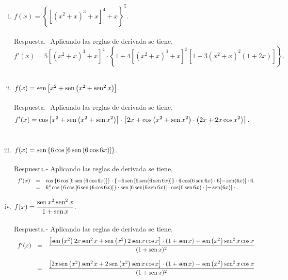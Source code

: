 \begin{enumerate}[\bfseries 1.]
\begin{enumerate}[(i)]
	    \item $f(x)=\left\{\left[\left(x^2+x\right)^3+x\right]^4+x\right\}^5$.\\\\
		Respuesta.-\; Aplicando las reglas de derivada se tiene,
		$$f'(x)=5\left[\left(x^2+x\right)^3+x\right]^4\cdot \left\{1+4\left[\left(x^2+x\right)^3+x\right]^3\left[1+3\left(x^2+x\right)^2\left(1+2x\right)\right]\right\}.$$\\

	    \item $f(x)=\sen\left[x^2+\sen\left(x^2+\sen^2 x\right)\right]$.\\\\
		Respuesta.-\; Aplicando las reglas de derivada se tiene,
		$$f'(x)=\cos\left[x^2+\sen\left(x^2+\sen x^2\right)\right]\cdot\left[2x+\cos\left(x^2+\sen x^2\right)\cdot \left(2x+2x\cos x^2\right)\right].$$\\

	    \item $f(x)=\sen\left\{6\cos\left[6\sen\left(6\cos 6x\right)\right]\right\}$.\\\\
		Respuesta.-\; Aplicando las reglas de derivada se tiene,
		$$\begin{array}{rcl}
		    f'(x)&=&\cos\left\{6\cos\left[6\sen\left(6\cos 6x\right)\right]\right\}\cdot\left\{ -6\sen\left[6\sen(6\sen 6x)\right]\right\}\cdot6\cos(6\sen 6x)\cdot 6[-\sen(6x)]\cdot 6.\\
		    &=&6^4\cos\left\{6\cos\left[6\sen\left(6\cos 6x\right)\right]\right\}\cdot\sen\left[6\sen(6\sen 6x)\right]\cdot\cos(6\sen 6x)\cdot [-\sen(6x)]\cdot.\\
		\end{array}$$
		\vspace{.7cm}

	    \item $f(x)=\dfrac{\sen x^2 \sen^2 x}{1+\sen x}$.\\\\
		Respuesta.-\; Aplicando las reglas de derivada se tiene,
		$$\begin{array}{rcl}
		    f'(x)&=&\dfrac{\left[\sen\left(x^2\right)2x\sen^2 x +\sen \left(x^2\right)2\sen x\cos x \right]\cdot (1+\sen x)-\sen \left(x^2\right)\sen^2 x\cos x}{(1+\sen x)^2}\\\\
		    &=&\dfrac{\left[2x\sen\left(x^2\right)\sen^2 x +2\sen \left(x^2\right)\sen x\cos x \right]\cdot (1+\sen x)-\sen \left(x^2\right)\sen^2 x\cos x}{(1+\sen x)^2}\\\\
		\end{array}$$
		\vspace{.7cm}


\end{enumerate}
\end{enumerate}
